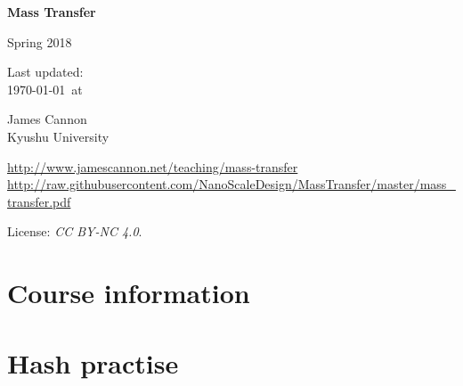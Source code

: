 \documentclass[a4paper]{book} %
\newcommand{\courseurl}{mass-transfer}
\begin{document}
\begin{titlepage}
    \begin{center}
        \vspace*{1cm}

        \Huge
        \textbf{Mass Transfer}

        Spring 2018

        \vspace{1.5cm}
        \Large
        Last updated:\\\today \ at \currenttime

        \vspace{4.0cm}
        \LARGE
        James Cannon\\Kyushu University
        \vfill

        \normalsize
        \url{http://www.jamescannon.net/teaching/\courseurl}\\
        \vspace{0.3cm}
        \small
        \url{http://raw.githubusercontent.com/NanoScaleDesign/MassTransfer/master/mass_transfer.pdf}
        \vspace{0.5cm}

        License: \emph{CC BY-NC 4.0}.

    \end{center}
\end{titlepage}

\setcounter{chapter}{-1}

\tableofcontents

\chapter{Course information}
\newpage


%


\chapter{Hash practise}


%

%
\end{document}
